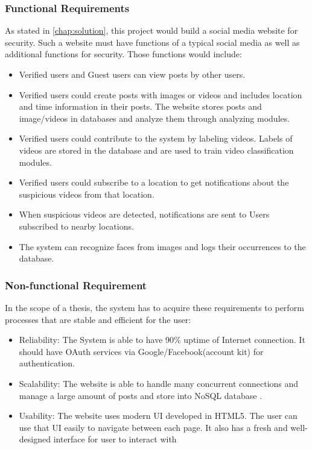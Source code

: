 \subsubsection{Functional Requirements}
As stated in \ref{chap:solution}, this project would build a social media website for security. Such a website must have functions of a typical social media as well as additional functions for security. Those functions would include:
\begin{itemize}	
    \item Verified users and Guest users can view posts by other users. 
    \item Verified users could create posts with images or videos and includes location and time information in their posts. The website stores posts and image/videos in databases and analyze them through analyzing modules.
    \item Verified users could contribute to the system by labeling videos. Labels of videos are stored in the database and are used to train video classification modules.
    \item Verified users could subscribe to a location to get notifications about the suspicious videos from that location.
    \item When suspicious videos are detected, notifications are sent to Users subscribed to nearby locations.
    \item The system can recognize faces from images and logs their occurrences to the database.
\end{itemize}


\subsubsection{Non-functional Requirement}
In the scope of a thesis, the system has to acquire these requirements to perform processes that are stable and efficient for the user:
\begin{itemize}
	\item Reliability: The System is able to have 90\% uptime of Internet connection. It should have OAuth services via Google/Facebook(account kit) for authentication.
	\item Scalability: The website is able to handle many concurrent connections and manage a large amount of posts and store into NoSQL database .
	\item Usability: The website uses modern UI developed in HTML5. The user can use that UI easily to navigate between each page. It also has a fresh and well-designed interface for user to interact with
\end{itemize} 
